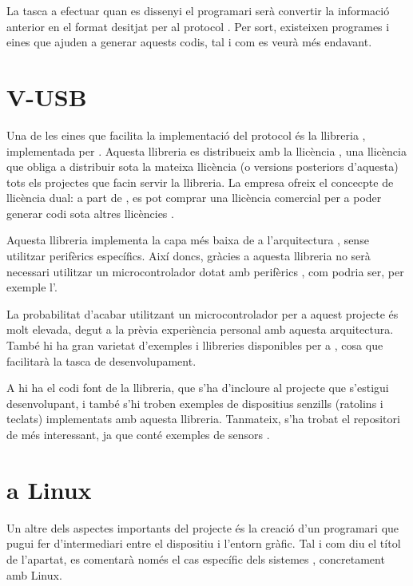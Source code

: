 La tasca a efectuar quan es dissenyi el programari serà convertir la
informació anterior en el format desitjat per al protocol . Per sort,
existeixen programes i eines que ajuden a generar aquests codis, tal i com
es veurà més endavant.

\section{V-USB}

Una de les eines que facilita la implementació del protocol  és la
llibreria , implementada per 
\cite{Vusb}. Aquesta llibreria
es distribueix amb la llicència , una llicència que obliga a
distribuir sota la mateixa llicència (o versions posteriors d'aquesta) tots els
projectes que facin servir la llibreria. La empresa ofreix el concecpte de
llicència dual: a part de , es pot comprar una llicència comercial
per a poder generar codi sota altres llicències \cite{VusbLicensing}.

Aquesta llibreria implementa la capa més baixa de  a l'arquitectura
, sense utilitzar perifèrics específics. Així doncs, gràcies a aquesta
llibreria no serà necessari utilitzar un microcontrolador  dotat amb
perifèrics , com podria ser, per exemple l'.

La probabilitat d'acabar utilitzant un microcontrolador  per a aquest
projecte és molt elevada, degut a la prèvia experiència personal amb aquesta
arquitectura. També hi ha gran varietat d'exemples i llibreries disponibles per
a , cosa que facilitarà la tasca de desenvolupament.

A \cite{Vusb} hi ha el codi font de la llibreria, que s'ha d'incloure al
projecte que s'estigui desenvolupant, i també s'hi troben exemples de dispositius
senzills (ratolins i teclats) implementats amb aquesta llibreria. Tanmateix,
s'ha trobat el repositori de \cite{VusbProjects} més interessant, ja que conté
exemples de sensors .

\section{ a Linux}

Un altre dels aspectes importants del projecte és la creació d'un programari
que pugui fer d'intermediari entre el dispositiu i l'entorn gràfic. Tal i com
diu el títol de l'apartat, es comentarà només el cas específic dels sistemes
, concretament amb Linux.

